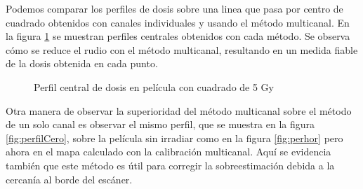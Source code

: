 Podemos comparar los perfiles de dosis sobre una linea que pasa por centro de cuadrado obtenidos con canales individuales y usando el método multicanal. En la figura \ref{fig:perfilesMapaCuadrado} se muestran perfiles centrales obtenidos con cada método. Se observa cómo se reduce el rudio con el método multicanal, resultando en un medida fiable de la dosis obtenida en cada punto. 
\begin{figure}[H]
	\centering
	\hfill
	\caption{Perfil central de dosis en película con cuadrado de 5 Gy}
	\label{fig:perfilesMapaCuadrado}
\end{figure}

Otra manera de observar la superioridad del método multicanal sobre el método de un solo canal es observar el mismo perfil, que se muestra en la figura \ref{fig:perfilCero}, sobre la película sin irradiar como en la figura \ref{fig:perhor} pero ahora en el mapa calculado con la calibración multicanal. Aquí se evidencia también que este método es útil para corregir la sobreestimación debida a la cercanía al borde del escáner.\\

